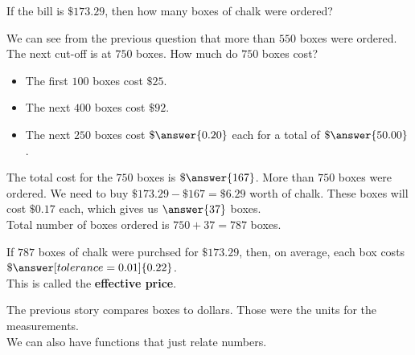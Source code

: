 \documentclass{ximera}
\begin{document}
\begin{question}
If the bill is $\$173.29$, then how many boxes of chalk were ordered?

\begin{explanation}

We can see from the previous question that more than $550$ boxes were ordered.  The next cut-off is at $750$ boxes.  How much do $750$ boxes cost? \\

\begin{itemize}
\item The first $100$ boxes cost $\$25$.
\item The next $400$ boxes cost $\$92$.
\item The next $250$ boxes cost $\$\answer{0.20}$ each for a total of $\$\answer{50.00}$.
\end{itemize}
The total cost for the $750$ boxes is $\$\answer{167}$. More than $750$ boxes were ordered.  We need to buy $\$173.29 - \$167 = \$6.29$ worth of chalk.  These boxes will cost $\$0.17$ each, which gives us $\answer{37}$ boxes.  \\


Total number of boxes ordered is $750 + 37 = 787$ boxes.


\end{explanation}
\end{question}



\begin{question}
If $787$ boxes of chalk were purchsed for $\$173.29$, then, on average, each box costs $\$\answer[tolerance=0.01]{0.22}$. \\

This is called the \textbf{effective price}.
\end{question}



The previous story compares boxes to dollars.  Those were the units for the measurements. \\



We can also have functions that just relate numbers. \\
\end{document}
